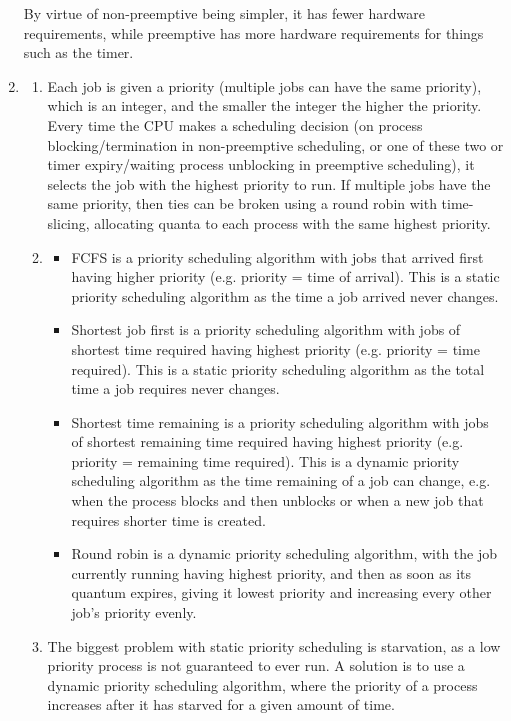 \documentclass[12pt]{article}
\begin{document}
\begin{enumerate}
            By virtue of non-preemptive being simpler, it has fewer hardware requirements, while preemptive has more hardware requirements for things such as the timer.
      \item \begin{enumerate}
                  \item Each job is given a priority (multiple jobs can have the same priority), which is an integer, and the smaller the integer the higher the priority. Every time the CPU makes a scheduling decision (on process blocking/termination in non-preemptive scheduling, or one of these two or timer expiry/waiting process unblocking in preemptive scheduling), it selects the job with the highest priority to run. If multiple jobs have the same priority, then ties can be broken using a round robin with time-slicing, allocating quanta to each process with the same highest priority.
                  \item \begin{itemize}
                              \item FCFS is a priority scheduling algorithm with jobs that arrived first having higher priority (e.g. priority = time of arrival). This is a static priority scheduling algorithm as the time a job arrived never changes.
                              \item Shortest job first is a priority scheduling algorithm with jobs of shortest time required having highest priority (e.g. priority = time required). This is a static priority scheduling algorithm as the total time a job requires never changes.
                              \item Shortest time remaining is a priority scheduling algorithm with jobs of shortest remaining time required having highest priority (e.g. priority = remaining time required). This is a dynamic priority scheduling algorithm as the time remaining of a job can change, e.g. when the process blocks and then unblocks or when a new job that requires shorter time is created.
                              \item Round robin is a dynamic priority scheduling algorithm, with the job currently running having highest priority, and then as soon as its quantum expires, giving it lowest priority and increasing every other job's priority evenly.
                        \end{itemize}
                  \item The biggest problem with static priority scheduling is starvation, as a low priority process is not guaranteed to ever run. A solution is to use a dynamic priority scheduling algorithm, where the priority of a process increases after it has starved for a given amount of time.

\end{enumerate}
\end{enumerate}
\end{document}
